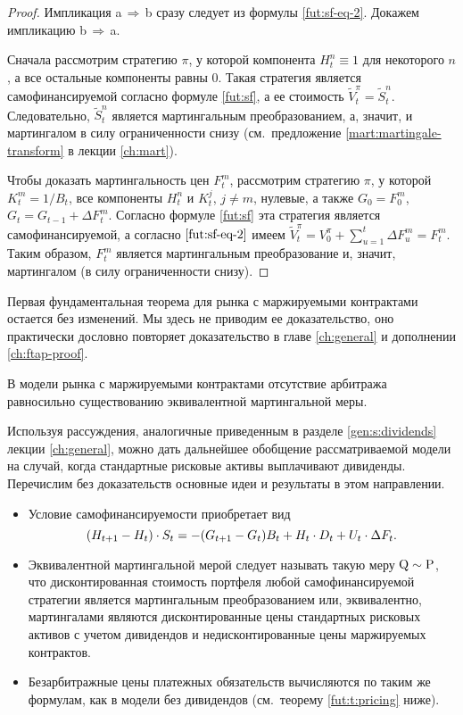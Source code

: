 \begin{proof}
Импликация a\,$\Rightarrow$\,b сразу следует из формулы \eqref{fut:sf-eq-2}.
Докажем импликацию b\,$\Rightarrow$\,a.

Сначала рассмотрим стратегию $\pi$, у которой компонента $H_t^n\equiv1$ для некоторого $n$, а все остальные компоненты равны 0.
Такая стратегия является самофинансируемой согласно формуле \eqref{fut:sf}, а ее стоимость $\tilde V_t^\pi = \tilde S_t^n$.
Следовательно, $\tilde S_t^n$ является мартингальным преобразованием, а, значит, и мартингалом в силу ограниченности снизу (см.~предложение \ref{mart:martingale-transform} в лекции \ref{ch:mart}).

Чтобы доказать мартингальность цен $F_t^m$, рассмотрим стратегию $\pi$, у которой $K_t^m = 1/B_t$, все компоненты $H^n_t$ и $K^j_t$, $j\neq m$, нулевые, а также $G_0 = F_0^m$, $G_t = G_{t-1} + \Delta F_t^m$. 
Согласно формуле \eqref{fut:sf} эта стратегия является самофинансируемой, а согласно $\eqref{fut:sf-eq-2}$ имеем $\tilde V_t^\pi = V_0^\pi + \sum_{u=1}^t \Delta F_u^m = F_t^m$.
Таким образом, $F_t^m$ является мартингальным преобразование и, значит, мартингалом (в силу ограниченности снизу).
\end{proof}

Первая фундаментальная теорема для рынка с маржируемыми контрактами остается без изменений.
Мы здесь не приводим ее доказательство, оно практически дословно повторяет доказательство в главе \ref{ch:general} и дополнении \ref{ch:ftap-proof}.

\begin{theorem}
В модели рынка с маржируемыми контрактами отсутствие арбитража равносильно существованию эквивалентной мартингальной меры.
\end{theorem}

\begin{remark}[$*$]
Используя рассуждения, аналогичные приведенным в разделе \ref{gen:s:dividends} лекции \ref{ch:general}, можно дать дальнейшее обобщение рассматриваемой модели на случай, когда стандартные рисковые активы выплачивают дивиденды.
Перечислим без доказательств основные идеи и результаты в этом направлении.
\begin{itemize}
\item Условие самофинансируемости приобретает вид
\[
{(H_{t+1}-H_t)}\cdot{S_t}  = -(G_{t+1}-G_t)B_t + {H_t}\cdot{D_t} + {U_t}\cdot{\Delta F_t}.
\]
\item Эквивалентной мартингальной мерой следует называть такую меру $\mathrm{Q}\sim\mathrm{P}$, что дисконтированная стоимость портфеля любой самофинансируемой стратегии является мартингальным преобразованием или, эквивалентно, мартингалами являются дисконтированные цены стандартных рисковых активов с учетом дивидендов и недисконтированные цены маржируемых контрактов.
\item Безарбитражные цены платежных обязательств вычисляются по таким же формулам, как в модели без дивидендов (см.~теорему \ref{fut:t:pricing} ниже).
\end{itemize}
\end{remark}


